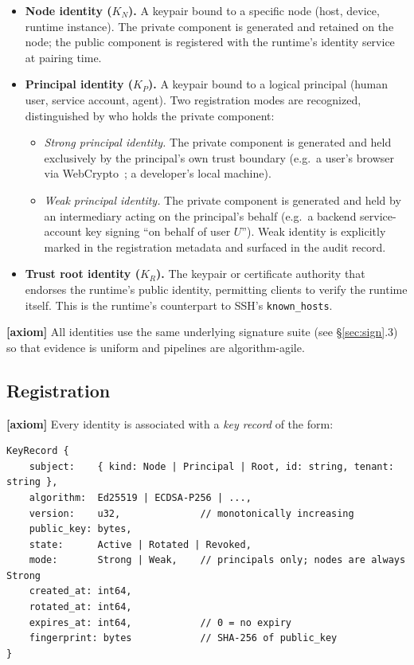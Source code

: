 \documentclass[11pt,a4paper]{article}
\newcommand{\axiom}{\textcolor{axiomcolor}{\textbf{[axiom]}}\xspace}
\begin{document}
\begin{itemize}[leftmargin=2em,itemsep=0.25em]
    \item \textbf{Node identity ($K_N$).} A keypair bound to a specific
    node (host, device, runtime instance). The private component is
    generated and retained on the node; the public component is
    registered with the runtime's identity service at pairing time.
    \item \textbf{Principal identity ($K_P$).} A keypair bound to a
    logical principal (human user, service account, agent). Two
    registration modes are recognized, distinguished by who holds the
    private component:
    \begin{itemize}
        \item \emph{Strong principal identity.} The private component is
        generated and held exclusively by the principal's own trust
        boundary (e.g.\ a user's browser via
        WebCrypto~\cite{webcrypto}; a developer's local machine).
        \item \emph{Weak principal identity.} The private component is
        generated and held by an intermediary acting on the principal's
        behalf (e.g.\ a backend service-account key signing
        ``on behalf of user $U$''). Weak identity is explicitly marked
        in the registration metadata and surfaced in the audit record.
    \end{itemize}
    \item \textbf{Trust root identity ($K_R$).} The keypair or
    certificate authority that endorses the runtime's public identity,
    permitting clients to verify the runtime itself. This is the
    runtime's counterpart to SSH's \texttt{known\_hosts}.
\end{itemize}

\axiom{} All identities use the same underlying signature suite (see
\S\ref{sec:sign}.3) so that evidence is uniform and pipelines are
algorithm-agile.

\subsection{Registration}

\axiom{} Every identity is associated with a \emph{key record} of the
form:
\begin{lstlisting}
KeyRecord {
    subject:    { kind: Node | Principal | Root, id: string, tenant: string },
    algorithm:  Ed25519 | ECDSA-P256 | ...,
    version:    u32,              // monotonically increasing
    public_key: bytes,
    state:      Active | Rotated | Revoked,
    mode:       Strong | Weak,    // principals only; nodes are always Strong
    created_at: int64,
    rotated_at: int64,
    expires_at: int64,            // 0 = no expiry
    fingerprint: bytes            // SHA-256 of public_key
}
\end{lstlisting}
\end{document}
